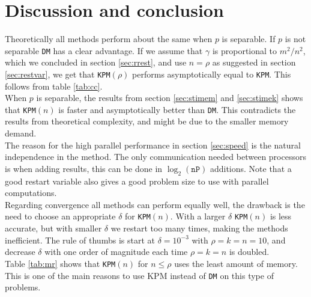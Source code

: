 \chapter{Discussion and conclusion}%

Theoretically all methods perform about the same when $p$ is separable. If $p$ is not separable \texttt{DM} has a clear advantage. If we assume that $\gamma$ is proportional to $m^2/n^2$, which we concluded in section \ref{sec:rrest}, and use $n = \rho$ as suggested in section \ref{sec:restvar}, we get that \texttt{KPM}$(\rho)$ performs asymptotically equal to \texttt{KPM}. This follows from table \ref{tab:cc}. \\

When $p$ is separable, the results from section \ref{sec:stimem} and \ref{sec:stimek} shows that \texttt{KPM}$(n)$ is faster and asymptotically better than \texttt{DM}. This contradicts the results from theoretical complexity, and might be due to the smaller memory demand. \\

The reason for the high parallel performance in section \ref{sec:speed} is the natural independence in the method. The only communication needed between processors is when adding results, this can be done in $\log_2(\texttt{nP})$ additions. Note that a good restart variable also gives a good problem size to use with parallel computations. \\

Regarding convergence all methods can perform equally well, the drawback is the need to choose an appropriate $\delta$ for \texttt{KPM}$(n)$. With a larger $\delta$ \texttt{KPM}$(n)$ is less accurate, but with smaller $\delta$ we restart too many times, making the methods inefficient. The rule of thumbs is start at $\delta=10^{-3}$ with $\rho = k = n = 10$, and decrease $\delta$ with one order of magnitude each time $\rho = k = n$ is doubled. \\

Table \ref{tab:mr} shows that \texttt{KPM}$(n)$ for $n \leq \rho$ uses the least amount of memory. This is one of the main reasons to use KPM instead of \texttt{DM} on this type of problems. \\

